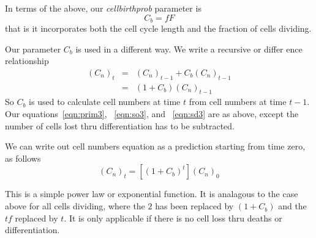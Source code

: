 \documentclass[titlepage]{article}  %
\begin{document}
In terms of the above, our {\em cellbirthprob} parameter is
\begin{displaymath}
C_{b} = f F
\end{displaymath}
that is it incorporates both the cell cycle length and the fraction of cells dividing.

Our parameter $C_{b}$ is used in a different way. We write a recursive or differ
ence relationship
\begin{eqnarray*}
(C_{n})_{t} & = & (C_{n})_{t-1} + C_{b} (C_{n})_{t-1} \\
           & = & (1 +  C_{b})(C_{n})_{t-1}
\end{eqnarray*}
So $C_{b}$ is used to calculate cell numbers at time $t$ from cell numbers at time $t-1$.  Our equations~\ref{eqn:prim3}, ~\ref{eqn:so3}, and ~\ref{eqn:sd3} are as above, except the number of cells lost thru differentiation has to be subtracted. 

We can write out cell numbers equation as a prediction starting from time zero, as follows
\begin{displaymath}
(C_{n})_{t} = \left[(1 +  C_{b})^t\right] (C_{n})_{0}
\end{displaymath}

This is a simple power law or exponential function. It is analagous to the case above for all cells dividing, where the $2$ has been replaced by $(1+C_{b})$ and the $tf$ replaced by $t$. It is only applicable if there is no cell loss thru deaths or differentiation.
\end{document}
